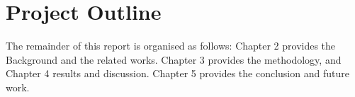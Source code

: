 \section{Project Outline}
The remainder of this report is organised as follows: Chapter 2 provides the Background and the related works. Chapter 3 provides the methodology, and Chapter 4  results and discussion. Chapter 5 provides the conclusion and future work.
